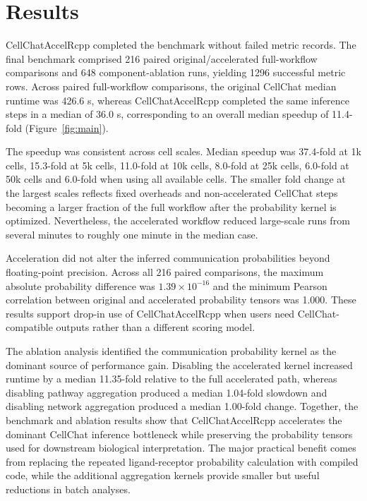 \documentclass[unnumsec,webpdf,contemporary,large]{oup-authoring-template}
\begin{document}
\section{Results}

CellChatAccelRcpp completed the benchmark without failed metric records.
The final benchmark comprised 216 paired original/accelerated full-workflow comparisons and 648 component-ablation runs, yielding 1296 successful metric rows.
Across paired full-workflow comparisons, the original CellChat median runtime was 426.6 s, whereas CellChatAccelRcpp completed the same inference steps in a median of 36.0 s, corresponding to an overall median speedup of 11.4-fold (Figure~\ref{fig:main}).

The speedup was consistent across cell scales.
Median speedup was 37.4-fold at 1k cells, 15.3-fold at 5k cells, 11.0-fold at 10k cells, 8.0-fold at 25k cells, 6.0-fold at 50k cells and 6.0-fold when using all available cells.
The smaller fold change at the largest scales reflects fixed overheads and non-accelerated CellChat steps becoming a larger fraction of the full workflow after the probability kernel is optimized.
Nevertheless, the accelerated workflow reduced large-scale runs from several minutes to roughly one minute in the median case.

Acceleration did not alter the inferred communication probabilities beyond floating-point precision.
Across all 216 paired comparisons, the maximum absolute probability difference was $1.39 \times 10^{-16}$ and the minimum Pearson correlation between original and accelerated probability tensors was 1.000.
These results support drop-in use of CellChatAccelRcpp when users need CellChat-compatible outputs rather than a different scoring model.

The ablation analysis identified the communication probability kernel as the dominant source of performance gain.
Disabling the accelerated kernel increased runtime by a median 11.35-fold relative to the full accelerated path, whereas disabling pathway aggregation produced a median 1.04-fold slowdown and disabling network aggregation produced a median 1.00-fold change.
Together, the benchmark and ablation results show that CellChatAccelRcpp accelerates the dominant CellChat inference bottleneck while preserving the probability tensors used for downstream biological interpretation.
The major practical benefit comes from replacing the repeated ligand-receptor probability calculation with compiled code, while the additional aggregation kernels provide smaller but useful reductions in batch analyses.
\end{document}
